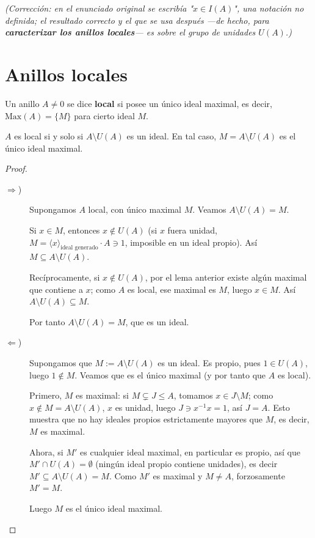 \emph{(Corrección: en el enunciado original se escribía "$x\in I(A)$", una notación no definida; el resultado correcto y el que se usa después —de hecho, para \textbf{caracterizar los anillos locales}— es sobre el grupo de unidades $U(A)$.)}

\section{Anillos locales}

\begin{definicion}
Un anillo $A\neq 0$ se dice \textbf{local} si posee un único ideal maximal, es decir, $\mathrm{Max}(A)=\{M\}$ para cierto ideal $M$.
\end{definicion}

\begin{prop}
$A$ es local si y solo si $A\setminus U(A)$ es un ideal. En tal caso, $M=A\setminus U(A)$ es el único ideal maximal.
\end{prop}
\begin{proof}\
\begin{description}
    \item[$\Rightarrow$)] Supongamos $A$ local, con único maximal $M$. Veamos $A\setminus U(A)=M$.

    Si $x\in M$, entonces $x\notin U(A)$ (si $x$ fuera unidad, $M=\langle x\rangle_{\text{ideal generado}}\cdot A \ni 1$, imposible en un ideal propio). Así $M\subseteq A\setminus U(A)$.

    Recíprocamente, si $x\notin U(A)$, por el lema anterior existe algún maximal que contiene a $x$; como $A$ es local, ese maximal es $M$, luego $x\in M$. Así $A\setminus U(A)\subseteq M$.

    Por tanto $A\setminus U(A)=M$, que es un ideal.

    \item[$\Leftarrow$)] Supongamos que $M:=A\setminus U(A)$ es un ideal. Es propio, pues $1\in U(A)$, luego $1\notin M$. Veamos que es el único maximal (y por tanto que $A$ es local).

    Primero, $M$ es maximal: si $M\subsetneq J \leq A$, tomamos $x\in J\setminus M$; como $x\notin M=A\setminus U(A)$, $x$ es unidad, luego $J\ni x^{-1}x=1$, así $J=A$. Esto muestra que no hay ideales propios estrictamente mayores que $M$, es decir, $M$ es maximal.

    Ahora, si $M'$ es cualquier ideal maximal, en particular es propio, así que $M'\cap U(A)=\emptyset$ (ningún ideal propio contiene unidades), es decir $M'\subseteq A\setminus U(A)=M$. Como $M'$ es maximal y $M\neq A$, forzosamente $M'=M$.

    Luego $M$ es el único ideal maximal.
\end{description}
\end{proof}

